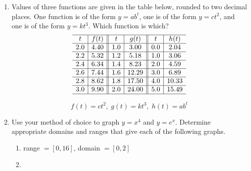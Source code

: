 \documentclass[11pt]{article}
\begin{document}
\begin{enumerate}
{\begin{center}
  \end{center}
}
  \vfill

\item Values of three functions are given in the table below, rounded
  to two decimal places.  One function is of the form $y=ab^t$, one is
  of the form $y=ct^2$, and one is of the form $y=kt^3$.  Which
  function is which?
  \[
  \begin{array}{c|c||c|c||c|c}
    \hline
    t & f(t) & t & g(t) & t  & h(t) \\ \hline
    2.0 & 4.40 & 1.0 & 3.00  & 0.0 & 2.04  \\ \hline
    2.2 & 5.32 & 1.2 & 5.18  & 1.0 & 3.06  \\ \hline
    2.4 & 6.34 & 1.4 & 8.23  & 2.0 & 4.59  \\ \hline
    2.6 & 7.44 & 1.6 & 12.29 & 3.0 & 6.89  \\ \hline
    2.8 & 8.62 & 1.8 & 17.50 & 4.0 & 10.33 \\ \hline
    3.0 & 9.90 & 2.0 & 24.00 & 5.0 & 15.49 \\ \hline
  \end{array}
  \]

  \vfill
  {\color{blue}
    \[
    f(t) = ct^2,\; g(t)=kt^3,\; h(t)=ab^t
    \]
  }
  \vfill

  \newpage
  
\item Use your method of choice to graph $y=x^4$ and $y=e^x$.
  Determine appropriate domains and ranges that give each of the
  following graphs.

  \begin{enumerate}
  \item 

    {\color{blue} range $=[0,16]$, domain $=[0,2]$}
    \vfill
  \item 
\end{enumerate}
\end{enumerate}
\end{document}
